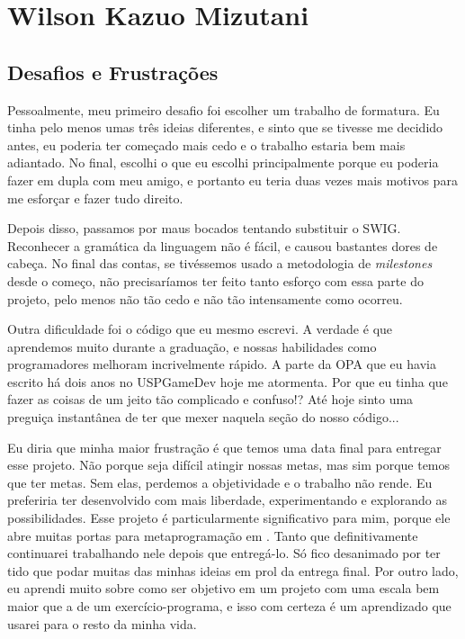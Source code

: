 \chapter{Wilson Kazuo Mizutani}
\label{cap:wil_subjetiva}

\section{Desafios e Frustrações}
\label{cap:wil:desafios_frustracoes}

Pessoalmente, meu primeiro desafio foi escolher um trabalho de formatura. Eu
tinha pelo menos umas três ideias diferentes, e sinto que se tivesse me decidido
antes, eu poderia ter começado mais cedo e o trabalho estaria bem mais
adiantado. No final, escolhi o que eu escolhi principalmente porque eu poderia
fazer em dupla com meu amigo, e portanto eu teria duas vezes mais motivos para
me esforçar e fazer tudo direito.

Depois disso, passamos por maus bocados tentando substituir o SWIG. Reconhecer a
gramática da linguagem \CXX{} não é fácil, e causou bastantes dores de cabeça.
No final das contas, se tivéssemos usado a metodologia de \textit{milestones}
desde o começo, não precisaríamos ter feito tanto esforço com essa parte do
projeto, pelo menos não tão cedo e não tão intensamente como ocorreu.

Outra dificuldade foi o código que eu mesmo escrevi. A verdade é que aprendemos
muito durante a graduação, e nossas habilidades como programadores melhoram
incrivelmente rápido. A parte da OPA que eu havia escrito há dois anos no
USPGameDev hoje me atormenta. Por que eu tinha que fazer as coisas de um jeito
tão complicado e confuso!? Até hoje sinto uma preguiça instantânea de ter que
mexer naquela seção do nosso código...

Eu diria que minha maior frustração é que temos uma data final para entregar
esse projeto. Não porque seja difícil atingir nossas metas, mas sim porque
temos que ter metas. Sem elas, perdemos a objetividade e o trabalho não rende.
Eu preferiria ter desenvolvido com mais liberdade, experimentando e explorando
as possibilidades. Esse projeto é particularmente significativo para mim, porque
ele abre muitas portas para metaprogramação em \CXX{}. Tanto que definitivamente
continuarei trabalhando nele depois que entregá-lo. Só fico desanimado por ter
tido que podar muitas das minhas ideias em prol da entrega final. Por outro lado,
eu aprendi muito sobre como ser objetivo em um projeto com uma escala bem maior
que a de um exercício-programa, e isso com certeza é um aprendizado que usarei
para o resto da minha vida.

